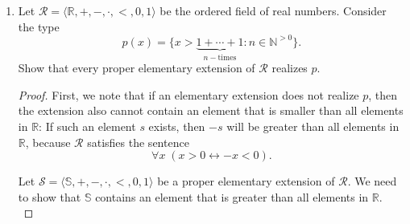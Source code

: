 \documentclass{article}
\begin{document}
\begin{enumerate}[label={\bf Q\arabic*:}]
\begin{proof}
      Now since $\varphi(\overline{x},y)$ is quantifier-free, we can
      express it in disjunctive normal form, i.e. a disjunction of
      formulas, each of which is a conjunction of atomic formulas. Hence we
      can assume that $\varphi(\overline{x},y)$ is a conjunction of atomic
      formulas $\phi(\overline{x},y)$. Now the given language has no
      relations, so an atomic formula $\phi(\overline{x},y)$ can only be
      of the form $t_1(\overline{x},y)\;\square\;t_2(\overline{x},y)$, where
      $t_1(\overline{x},y)$ and $t_2(\overline{x},y)$ are terms and
      $\square$ is either $=$ or $\neq$. Now in the given language, each
      term $t(\overline{x},y)$ is equivalent to the form
      \begin{align*}
        f_1x_1+\ldots+f_nx_n+fy,
      \end{align*}
      where $f_1,f\in F$. Note that we can remove all parts of the term
      involving $0$ since $g0=0$ for all $g\in F$ and $0+t=t+0=t$ for all
      terms $t$. Then the atomic formula
      $t_1(\overline{x},y)\;\square\;t_2(\overline{x},y)$ will be
      equivalent to the form
      \begin{align*}
        y\;\square\;f_1x_1+\ldots+f_nx_n.
      \end{align*}
    \end{proof}

  \item Let $\mathcal{R}=\langle\mathbb{R},+,-,\cdot,<,0,1\rangle$ be the
    ordered field of real numbers. Consider the type
    \begin{equation*}
      p(x) =
      \{x>\underbrace{1+\cdots+1}_{n-\text{times}}:n\in\mathbb{N}^{>0}\}.
    \end{equation*}
    Show that every proper elementary extension of $\mathcal{R}$ realizes
    $p$.

    \begin{proof}
      First, we note that if an elementary extension does not realize $p$,
      then the extension also cannot contain an element that is smaller
      than all elements in $\mathbb{R}$: If such an element $s$ exists,
      then $-s$ will be greater than all elements in $\mathbb{R}$, because
      $\mathcal{R}$ satisfies the sentence
      \begin{equation*}
        \forall x\; (x>0\leftrightarrow -x<0).
      \end{equation*}

      Let $\mathcal{S}=\langle\mathbb{S},+,-,\cdot,<,0,1\rangle$ be a
      proper elementary extension of $\mathcal{R}$. We need to show that
      $\mathbb{S}$ contains an element that is greater than all elements in
      $\mathbb{R}$. \\


\end{proof}
\end{enumerate}
\end{document}
